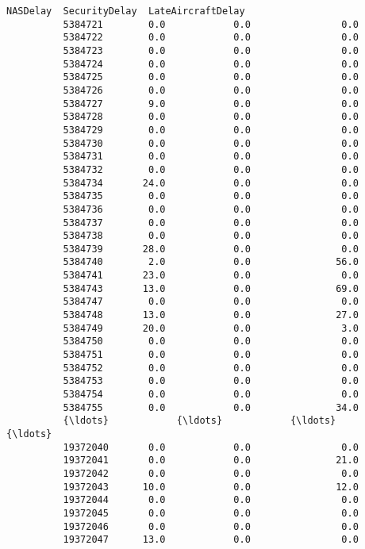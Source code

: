\documentclass[11pt]{article}
\begin{document}
\begin{Verbatim}[commandchars=\\\{\}]
                    NASDelay  SecurityDelay  LateAircraftDelay  
          5384721        0.0            0.0                0.0  
          5384722        0.0            0.0                0.0  
          5384723        0.0            0.0                0.0  
          5384724        0.0            0.0                0.0  
          5384725        0.0            0.0                0.0  
          5384726        0.0            0.0                0.0  
          5384727        9.0            0.0                0.0  
          5384728        0.0            0.0                0.0  
          5384729        0.0            0.0                0.0  
          5384730        0.0            0.0                0.0  
          5384731        0.0            0.0                0.0  
          5384732        0.0            0.0                0.0  
          5384734       24.0            0.0                0.0  
          5384735        0.0            0.0                0.0  
          5384736        0.0            0.0                0.0  
          5384737        0.0            0.0                0.0  
          5384738        0.0            0.0                0.0  
          5384739       28.0            0.0                0.0  
          5384740        2.0            0.0               56.0  
          5384741       23.0            0.0                0.0  
          5384743       13.0            0.0               69.0  
          5384747        0.0            0.0                0.0  
          5384748       13.0            0.0               27.0  
          5384749       20.0            0.0                3.0  
          5384750        0.0            0.0                0.0  
          5384751        0.0            0.0                0.0  
          5384752        0.0            0.0                0.0  
          5384753        0.0            0.0                0.0  
          5384754        0.0            0.0                0.0  
          5384755        0.0            0.0               34.0  
          {\ldots}            {\ldots}            {\ldots}                {\ldots}  
          19372040       0.0            0.0                0.0  
          19372041       0.0            0.0               21.0  
          19372042       0.0            0.0                0.0  
          19372043      10.0            0.0               12.0  
          19372044       0.0            0.0                0.0  
          19372045       0.0            0.0                0.0  
          19372046       0.0            0.0                0.0  
          19372047      13.0            0.0                0.0  

\end{Verbatim}
\end{document}
